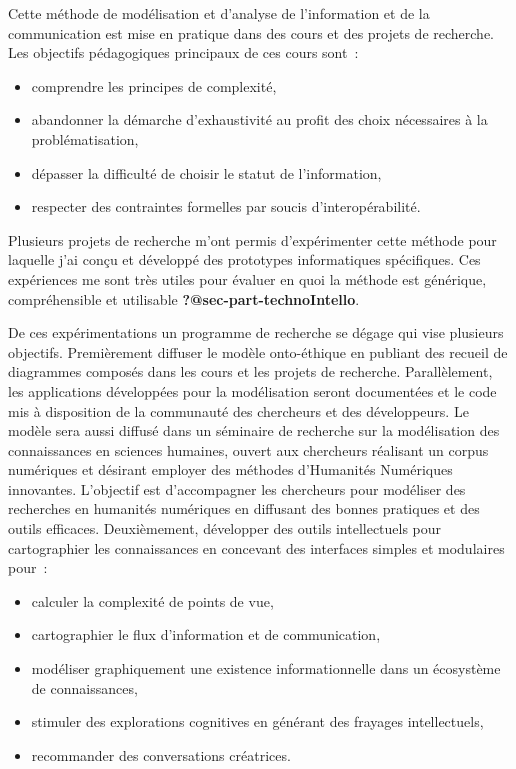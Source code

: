 \documentclass[
  a4paper,
  DIV=11,
  numbers=noendperiod]{scrreprt}
\begin{document}
Cette méthode de modélisation et d'analyse de l'information et de la
communication est mise en pratique dans des cours et des projets de
recherche. Les objectifs pédagogiques principaux de ces cours sont~:

\begin{itemize}
\item
  comprendre les principes de complexité,
\item
  abandonner la démarche d'exhaustivité au profit des choix nécessaires
  à la problématisation,
\item
  dépasser la difficulté de choisir le statut de l'information,
\item
  respecter des contraintes formelles par soucis d'interopérabilité.
\end{itemize}

Plusieurs projets de recherche m'ont permis d'expérimenter cette méthode
pour laquelle j'ai conçu et développé des prototypes informatiques
spécifiques. Ces expériences me sont très utiles pour évaluer en quoi la
méthode est générique, compréhensible et utilisable
\textbf{?@sec-part-technoIntello}.

De ces expérimentations un programme de recherche se dégage qui vise
plusieurs objectifs. Premièrement diffuser le modèle onto-éthique en
publiant des recueil de diagrammes composés dans les cours et les
projets de recherche. Parallèlement, les applications développées pour
la modélisation seront documentées et le code mis à disposition de la
communauté des chercheurs et des développeurs. Le modèle sera aussi
diffusé dans un séminaire de recherche sur la modélisation des
connaissances en sciences humaines, ouvert aux chercheurs réalisant un
corpus numériques et désirant employer des méthodes d'Humanités
Numériques innovantes. L'objectif est d'accompagner les chercheurs pour
modéliser des recherches en humanités numériques en diffusant des bonnes
pratiques et des outils efficaces. Deuxièmement, développer des outils
intellectuels pour cartographier les connaissances en concevant des
interfaces simples et modulaires pour~:

\begin{itemize}
\item
  calculer la complexité de points de vue,
\item
  cartographier le flux d'information et de communication,
\item
  modéliser graphiquement une existence informationnelle dans un
  écosystème de connaissances,
\item
  stimuler des explorations cognitives en générant des frayages
  intellectuels,
\item
  recommander des conversations créatrices.
\end{itemize}
\end{document}
